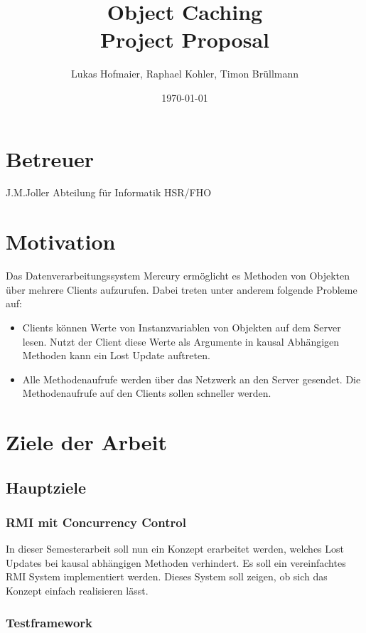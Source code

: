 \documentclass{article}
\title{Object Caching\\Project Proposal}
\author{Lukas Hofmaier, Raphael Kohler, Timon Brüllmann}
\date{\today}
\begin{document}
\maketitle
\section{Betreuer}
J.M.Joller  Abteilung für Informatik HSR/FHO

\section{Motivation}
Das Datenverarbeitungssystem Mercury ermöglicht es Methoden von Objekten über mehrere Clients aufzurufen. Dabei treten unter anderem folgende Probleme auf:

\begin{itemize}
\item Clients können Werte von Instanzvariablen von Objekten auf dem Server lesen. Nutzt der Client diese Werte als Argumente in kausal Abhängigen Methoden kann ein Lost Update auftreten.
\item Alle Methodenaufrufe werden über das Netzwerk an den Server gesendet. Die Methodenaufrufe auf den Clients sollen schneller werden.
\end{itemize}


\section{Ziele der Arbeit}

\subsection{Hauptziele}
\label{sec:hauptziele}

\subsubsection{RMI mit Concurrency Control}
\label{sec:rmi-mit-concurrency}

In dieser Semesterarbeit soll nun ein Konzept erarbeitet werden, welches Lost Updates bei kausal abhängigen Methoden verhindert.  Es soll ein vereinfachtes RMI System implementiert werden. Dieses System soll zeigen, ob sich das Konzept einfach realisieren lässt.

\subsubsection{Testframework}
\label{sec:testframework}
\end{document}
